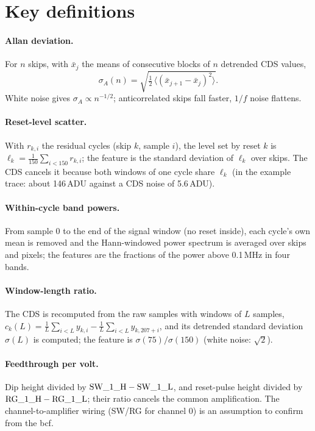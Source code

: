 \documentclass[10pt]{article}
\renewcommand{\_}{\oldunderscore\allowbreak}
\begin{document}
\section{Key definitions}

\paragraph{Allan deviation.} For $n$ skips, with $\bar{x}_j$ the means of consecutive blocks of $n$ detrended CDS values,
\begin{equation}
\sigma_A(n) = \sqrt{\tfrac{1}{2}\,\langle(\bar{x}_{j+1}-\bar{x}_j)^2\rangle}.
\end{equation}
White noise gives $\sigma_A\propto n^{-1/2}$; anticorrelated skips fall faster, $1/f$ noise flattens.

\paragraph{Reset-level scatter.} With $r_{k,i}$ the residual cycles (skip $k$, sample $i$), the level set by reset $k$ is
$\ell_k=\frac{1}{150}\sum_{i<150} r_{k,i}$; the feature is the standard deviation of $\ell_k$ over skips. The CDS cancels it
because both windows of one cycle share $\ell_k$ (in the example trace: about 146\,ADU against a CDS noise of 5.6\,ADU).

\paragraph{Within-cycle band powers.} From sample 0 to the end of the signal window (no reset inside), each cycle's own mean is
removed and the Hann-windowed power spectrum is averaged over skips and pixels; the features are the fractions of the power
above 0.1\,MHz in four bands.

\paragraph{Window-length ratio.} The CDS is recomputed from the raw samples with windows of $L$ samples,
$c_k(L)=\frac{1}{L}\sum_{i<L}y_{k,i}-\frac{1}{L}\sum_{i<L}y_{k,207+i}$, and its detrended standard deviation $\sigma(L)$ is
computed; the feature is $\sigma(75)/\sigma(150)$ (white noise: $\sqrt{2}$).

\paragraph{Feedthrough per volt.} Dip height divided by $\mathrm{SW\_1\_H}-\mathrm{SW\_1\_L}$, and reset-pulse height divided by
$\mathrm{RG\_1\_H}-\mathrm{RG\_1\_L}$; their ratio cancels the common amplification. The channel-to-amplifier wiring (SW\_1/RG\_1
for channel 0) is an assumption to confirm from the bcf.
\end{document}
